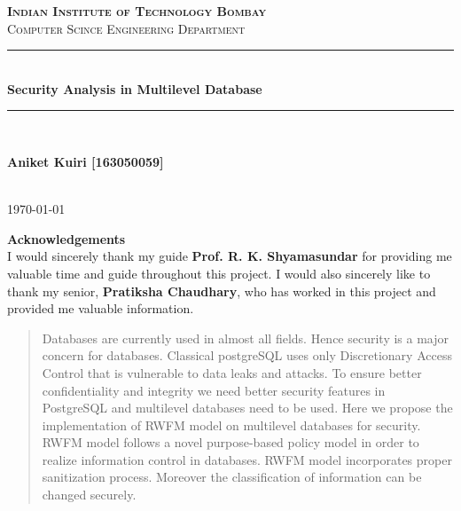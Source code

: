 \documentclass[11pt,a4paper]{report}
\begin{document}
\begin{titlepage}

\newcommand{\HRule}{\rule{\linewidth}{0.5mm}} 
\center  
\textsc{\LARGE{\textbf{Indian Institute of Technology Bombay}} }\\[1.5cm]
\textsc{\Large Computer Scince Engineering Department}\\[1cm] 
\HRule \\[0.5cm]
{ \huge \bfseries Security Analysis in Multilevel Database}\\[0.5cm] 
\HRule \\[1.5cm]
\begin{minipage}{1\textwidth}
\begin{center}

\Large{{\textbf{Aniket Kuiri [163050059]}}}\\

\end{center}
\end{minipage}\\[5cm]
{\large \today}\\[2cm]
\end{titlepage}
\newpage
\tableofcontents
\newpage
\begin{minipage}{1 \textwidth}
{ \huge \bfseries Acknowledgements}\\[0.5cm] 
I would sincerely thank my guide \textbf{Prof. R. K. Shyamasundar} for providing me valuable time and guide throughout this project. I would also sincerely like to thank my senior, \textbf{Pratiksha Chaudhary}, who has worked in this project and provided me valuable information.
\end{minipage}
\begin{abstract}
 Databases are currently used in almost all fields. Hence security is a major concern for databases. Classical postgreSQL uses only Discretionary Access Control that is vulnerable to data leaks and attacks. To ensure better confidentiality and integrity we need better security features in PostgreSQL and multilevel databases need to be used. Here we propose the implementation of RWFM model\cite{Someone2002} on multilevel databases for security. RWFM model follows a novel purpose-based policy model in order to realize information control in databases. RWFM model incorporates proper sanitization process. Moreover the classification of information can be changed securely. 
\end{abstract}
\end{document}
